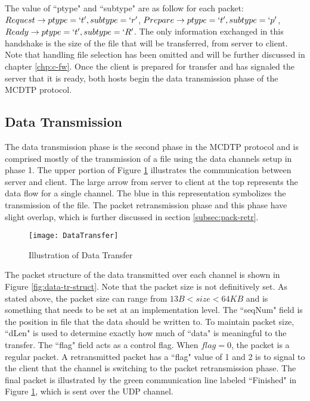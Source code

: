  The value of ``ptype" and ``subtype" are as follow for each packet: $Request \rightarrow ptype = \lq{t}\rq,subtype = \lq{r}\rq$, $Prepare \rightarrow ptype = \lq{t}\rq,subtype = \lq{p}\rq$, $Ready \rightarrow ptype = \lq{t}\rq,subtype = \lq{R}\rq$. The only information exchanged in this handshake is the size of the file that will be transferred, from server to client. Note that handling file selection has been omitted and will be further discussed in chapter \ref{chp:c-fw}. Once the client is prepared for transfer and has signaled the server that it is ready, both hosts begin the data transmission phase of the MCDTP protocol.

\subsection{Data Transmission}

The data transmission phase is the second phase in the MCDTP protocol and is comprised mostly of the transmission of a file using the data channels setup in phase 1. The upper portion of Figure \ref{fig:data-tr} illustrates the communication between server and client. The large arrow from server to client at the top represents the data flow for a single channel. The blue in this representation symbolizes the transmission of the file. The packet retransmission phase and this phase have slight overlap, which is further discussed in section \ref{subsec:pack-retr}.

\begin{figure}[ht]
\centering
\texttt{[image: DataTransfer]}
\caption{Illustration of Data Transfer}
\label{fig:data-tr}
\end{figure}

The packet structure of the data transmitted over each channel is shown in Figure \ref{fig:data-tr-struct}. Note that the packet size is not definitively set. As stated above, the packet size can range from $13B < size < 64KB$ and is something that needs to be set at an implementation level. The ``seqNum" field is the position in file that the data should be written to. To maintain packet size, ``dLen" is used to determine exactly how much of ``data" is meaningful to the transfer. The ``flag" field acts as a control flag. When $flag=0$, the packet is a regular packet. A retransmitted packet has a ``flag" value of 1 and 2 is to signal to the client that the channel is switching to the packet retransmission phase. The final packet is illustrated by the green communication line labeled ``Finished" in Figure \ref{fig:data-tr}, which is sent over the UDP channel.

